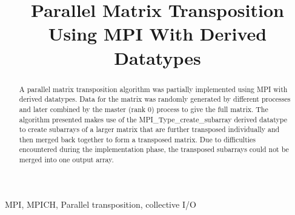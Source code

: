 \documentclass[journal]{IEEEtran}
\begin{document}
%
\title{Parallel Matrix Transposition Using MPI With Derived Datatypes}
%
%
%

\author{}

\maketitle

\begin{abstract}
A parallel matrix transposition algorithm was partially implemented using MPI with derived datatypes. Data for the matrix was randomly generated by different processes and later combined by the master (rank 0) process to give the full matrix. The algorithm presented makes use of the MPI\_Type\_create\_subarray derived datatype to create subarrays of a larger matrix that are further transposed individually and then merged back together to form a transposed matrix. Due to difficulties encountered during the implementation phase, the transposed subarrays could not be merged into one output array.
\end{abstract}

\begin{IEEEkeywords}
MPI, MPICH, Parallel transposition, collective I/O
\end{IEEEkeywords}
\end{document}
